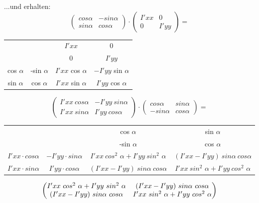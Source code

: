 \documentclass{ezb}
\begin{document}
...und erhalten:
\begin{equation}
\begin{pmatrix}
cos \alpha & - sin \alpha \\
sin \alpha & cos \alpha 
\end{pmatrix}
\cdot
\begin{pmatrix}
I'xx & 0 \\
0 & I'yy
\end{pmatrix}
=
\end{equation}
\begin{center}
\begin{tabular}{ c  c  | c  c}         
  			&				& $I'xx$ & 0 \\
  			&				& 0 & $I'yy$ \\
  	\hline    
  cos $\alpha$ & -sin $\alpha$ 	& $I'xx$ cos $\alpha$ & $- I'yy$ sin $\alpha$\\
  sin $\alpha$ & cos $\alpha$ 	& $I'xx$ sin $\alpha$ & $I'yy$ cos $\alpha$\\ 
\end{tabular}
\end{center}
\begin{equation}
\begin{pmatrix}
I'xx \ cos \alpha & - I'yy \ sin \alpha \\
I'xx \ sin \alpha & I'yy \ cos \alpha 
\end{pmatrix}
\cdot
\begin{pmatrix}
cos \alpha & sin \alpha \\
-sin \alpha & cos \alpha 
\end{pmatrix}
=
\label{drehformel2}
\end{equation}
\begin{center}
\begin{tabular}{ c  c  | c  c}                   
  					 &						& cos $\alpha$ & sin $\alpha$ \\
  					 &						& -sin $\alpha$ & cos $\alpha$ \\
  	\hline    
  $I'xx \cdot cos \alpha$ & $-I'yy \cdot sin \alpha$ 	& $I'xx \ cos^{2}$ $\alpha + I'yy \ sin^{2}$ $\alpha$ & $(I'xx - I'yy) \ sin \alpha \ cos \alpha$\\
  $I'xx \cdot sin \alpha$ & $I'yy \cdot cos \alpha$ 	&  $(I'xx - I'yy) \ sin \alpha \ cos \alpha$ & $I'xx \ sin^{2}$ $\alpha + I'yy \ cos^{2}$ $\alpha$\\ 
\end{tabular}
\end{center}
\begin{equation}
\begin{pmatrix}
I'xx \ cos^{2}$ $\alpha + I'yy \ sin^{2}$ $\alpha &(I'xx - I'yy) \ sin \alpha \ cos \alpha \\
(I'xx - I'yy) \ sin \alpha \ cos \alpha & I'xx \ sin^{2}$ $\alpha + I'yy \ cos^{2}$ $\alpha
\end{pmatrix}
\end{equation}
\end{document}
